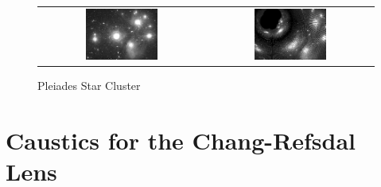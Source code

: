\documentclass[a4paper]{IEEEtran}
\begin{document}
\begin{figure}
    \caption{Pleiades Star Cluster} 
    \label{fig:pleiades} 
    \begin{center}
        \begin{tabular}{cc}
            \includegraphics[width=0.45\textwidth]{Pics/pl.eps} &
            \includegraphics[width=0.45\textwidth]{Pics/pl2e30.eps} 
        \end{tabular}
    \end{center}
\end{figure}

\section{Caustics for the Chang-Refsdal Lens}
\end{document}
